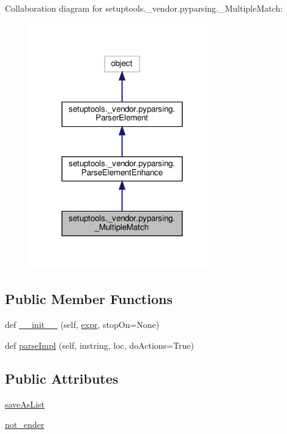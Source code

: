 Collaboration diagram for setuptools.\+\_\+vendor.\+pyparsing.\+\_\+\+Multiple\+Match\+:
\nopagebreak
\begin{figure}[H]
\begin{center}
\leavevmode
\includegraphics[width=227pt]{classsetuptools_1_1__vendor_1_1pyparsing_1_1__MultipleMatch__coll__graph}
\end{center}
\end{figure}
\subsection*{Public Member Functions}
\begin{DoxyCompactItemize}
\item 
def \hyperlink{classsetuptools_1_1__vendor_1_1pyparsing_1_1__MultipleMatch_a26334a65340c9c7968899af11df6ca0e}{\+\_\+\+\_\+init\+\_\+\+\_\+} (self, \hyperlink{classsetuptools_1_1__vendor_1_1pyparsing_1_1ParseElementEnhance_a445450bd765a74cc1d1567e40cade40d}{expr}, stop\+On=None)
\item 
def \hyperlink{classsetuptools_1_1__vendor_1_1pyparsing_1_1__MultipleMatch_a54ef7a66f36ea38bb55c94f094174888}{parse\+Impl} (self, instring, loc, do\+Actions=True)
\end{DoxyCompactItemize}
\subsection*{Public Attributes}
\begin{DoxyCompactItemize}
\item 
\hyperlink{classsetuptools_1_1__vendor_1_1pyparsing_1_1__MultipleMatch_a5ad2986e516fe2b06dcda98bea4b40cb}{save\+As\+List}
\item 
\hyperlink{classsetuptools_1_1__vendor_1_1pyparsing_1_1__MultipleMatch_a389ceb816e9197295e6915dd8b2940a5}{not\+\_\+ender}
\end{DoxyCompactItemize}
